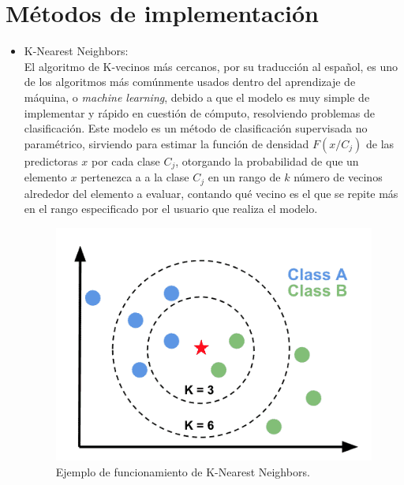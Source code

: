 \documentclass[spanish,12pt,letterpaper]{article}
\begin{document}
\section{Métodos de implementación}
\begin{itemize}
    \item K-Nearest Neighbors:\\
    El algoritmo de K-vecinos más cercanos, por su traducción al español, es uno de los algoritmos más comúnmente usados dentro del aprendizaje de máquina, o \textit{machine learning}, debido a que el modelo es muy simple de implementar y rápido en cuestión de cómputo, resolviendo problemas de clasificación. Este modelo es un método de clasificación supervisada no paramétrico, sirviendo para estimar la función de densidad $F(x/C_j)$ de las predictoras $x$ por cada clase $C_j$, otorgando la probabilidad de que un elemento $x$ pertenezca a a la clase $C_j$ en un rango de $k$ número de vecinos alrededor del elemento a evaluar, contando qué vecino es el que se repite más en el rango especificado por el usuario que realiza el modelo.
    \begin{figure}[H]
        \centering
        \includegraphics[width=1\columnwidth]{kNN_Neighbors.png}
        \caption{Ejemplo de funcionamiento de K-Nearest Neighbors.}
        \label{fig:comand}%
    \end{figure}
    

\end{itemize}
\end{document}
